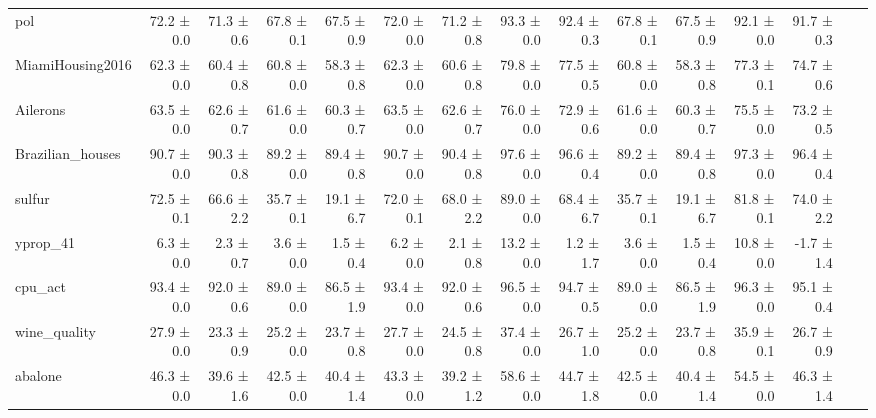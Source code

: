\begin{table}
\begin{tabular}{l|rr|rr|rr||rr|rr|rr|rr}
pol & 72.2 ± 0.0 & 71.3 ± 0.6 & 67.8 ± 0.1 & 67.5 ± 0.9 & 72.0 ± 0.0 & 71.2 ± 0.8 & 93.3 ± 0.0 & 92.4 ± 0.3 & 67.8 ± 0.1 & 67.5 ± 0.9 & 92.1 ± 0.0 & 91.7 ± 0.3 \\
MiamiHousing2016 & 62.3 ± 0.0 & 60.4 ± 0.8 & 60.8 ± 0.0 & 58.3 ± 0.8 & 62.3 ± 0.0 & 60.6 ± 0.8 & 79.8 ± 0.0 & 77.5 ± 0.5 & 60.8 ± 0.0 & 58.3 ± 0.8 & 77.3 ± 0.1 & 74.7 ± 0.6 \\
Ailerons & 63.5 ± 0.0 & 62.6 ± 0.7 & 61.6 ± 0.0 & 60.3 ± 0.7 & 63.5 ± 0.0 & 62.6 ± 0.7 & 76.0 ± 0.0 & 72.9 ± 0.6 & 61.6 ± 0.0 & 60.3 ± 0.7 & 75.5 ± 0.0 & 73.2 ± 0.5 \\
Brazilian\_houses & 90.7 ± 0.0 & 90.3 ± 0.8 & 89.2 ± 0.0 & 89.4 ± 0.8 & 90.7 ± 0.0 & 90.4 ± 0.8 & 97.6 ± 0.0 & 96.6 ± 0.4 & 89.2 ± 0.0 & 89.4 ± 0.8 & 97.3 ± 0.0 & 96.4 ± 0.4 \\
sulfur & 72.5 ± 0.1 & 66.6 ± 2.2 & 35.7 ± 0.1 & 19.1 ± 6.7 & 72.0 ± 0.1 & 68.0 ± 2.2 & 89.0 ± 0.0 & 68.4 ± 6.7 & 35.7 ± 0.1 & 19.1 ± 6.7 & 81.8 ± 0.1 & 74.0 ± 2.2 \\
yprop\_41 & 6.3 ± 0.0 & 2.3 ± 0.7 & 3.6 ± 0.0 & 1.5 ± 0.4 & 6.2 ± 0.0 & 2.1 ± 0.8 & 13.2 ± 0.0 & 1.2 ± 1.7 & 3.6 ± 0.0 & 1.5 ± 0.4 & 10.8 ± 0.0 & -1.7 ± 1.4 \\
cpu\_act & 93.4 ± 0.0 & 92.0 ± 0.6 & 89.0 ± 0.0 & 86.5 ± 1.9 & 93.4 ± 0.0 & 92.0 ± 0.6 & 96.5 ± 0.0 & 94.7 ± 0.5 & 89.0 ± 0.0 & 86.5 ± 1.9 & 96.3 ± 0.0 & 95.1 ± 0.4 \\
wine\_quality & 27.9 ± 0.0 & 23.3 ± 0.9 & 25.2 ± 0.0 & 23.7 ± 0.8 & 27.7 ± 0.0 & 24.5 ± 0.8 & 37.4 ± 0.0 & 26.7 ± 1.0 & 25.2 ± 0.0 & 23.7 ± 0.8 & 35.9 ± 0.1 & 26.7 ± 0.9 \\
abalone & 46.3 ± 0.0 & 39.6 ± 1.6 & 42.5 ± 0.0 & 40.4 ± 1.4 & 43.3 ± 0.0 & 39.2 ± 1.2 & 58.6 ± 0.0 & 44.7 ± 1.8 & 42.5 ± 0.0 & 40.4 ± 1.4 & 54.5 ± 0.0 & 46.3 ± 1.4 \\
\hline
\end{tabular}
\end{table}
